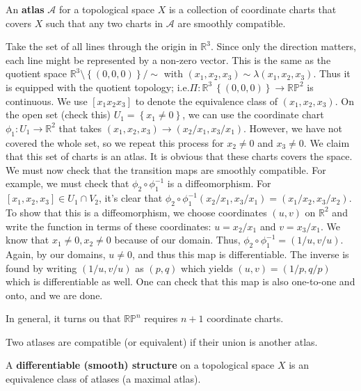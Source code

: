 \documentclass{mathnotes}
\begin{document}
\begin{defn}
    An \textbf{atlas} $\mathcal{A}$ for a topological space $X$ is a collection of coordinate charts that covers $X$ such that any two charts in $\mathcal{A}$
    are smoothly compatible.
\end{defn}

\begin{exmp}
    Take the set of all lines through the origin in $\mathbb{R}^3$. Since only the direction matters, each line might be represented by a non-zero vector.
    This is the same as the quotient space $\mathbb{R}^3\setminus \left\{ (0,0,0) \right\}/\sim$ with $(x_1,x_2,x_3)\sim\lambda (x_1,x_2,x_3)$. Thus it is equipped
    with the quotient topology; i.e.$\Pi: \mathbb{R}^3\ \left\{ (0,0,0) \right\}\to \mathbb{R}\mathbb{P}^2$ is continuous. We use $\left[ x_1 x_2 x_3 \right]$ to
    denote the equivalence class of $\left( x_1, x_2, x_3 \right)$. On the open set (check this) $U_1=\left\{ x_1\neq 0 \right\}$, we can use the coordinate chart
    $\phi_1:U_1\to\mathbb{R}^2$ that takes $(x_1,x_2,x_3)\to\left( x_2/x_1, x_3/x_1 \right)$. However, we have not covered the whole set, so we repeat this process
    for $x_2\neq0$ and $x_3\neq 0$. We claim that this set of charts is an atlas. It is obvious that these charts covers the space. We must now check that the
    transition maps are smoothly compatible. For example, we must check that $\phi_2\circ\phi_1^{-1}$ is a diffeomorphism. For $\left[ x_1,x_2,x_3 \right]\in U_1\cap V_2$,
    it's clear that $\phi_2\circ\phi_1^{-1}(x_2/x_1,x_3/x_1)=(x_1/x_2,x_3/x_2)$. To show that this is a diffeomorphism, we choose coordinates $(u,v)$ on $\mathbb{R}^2$
    and write the function in terms of these coordinates: $u=x_2/x_1$ and $v=x_3/x_1$. We know that $x_1\neq 0,x_2\neq 0$ because of our domain. Thus,
    $\phi_2\circ\phi_1^{-1}=(1/u,v/u)$. Again, by our domains, $u\neq 0$, and thus this map is differentiable. The inverse is found by writing $(1/u,v/u)$ as $(p, q)$
    which yields $(u,v)=(1/p,q/p)$ which is differentiable as well. One can check that this map is also one-to-one and onto, and we are done.
\end{exmp}

In general, it turns ou that $\mathbb{RP}^n$ requires $n+1$ coordinate charts.

\begin{defn}
    Two atlases are compatible (or equivalent) if their union is another atlas.
\end{defn}

\begin{defn}
    A \textbf{differentiable (smooth) structure} on a topological space $X$ is an equivalence class of atlases (a maximal atlas).
\end{defn}
\end{document}

